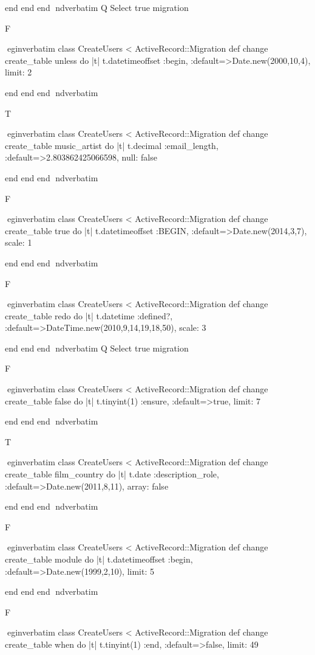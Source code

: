     end 
  end 
end
nd{verbatim}
Q
 Select true migration

F

egin{verbatim}
 class CreateUsers < ActiveRecord::Migration 
  def change 
    create_table unless do |t| 
      t.datetimeoffset :begin, :default=>Date.new(2000,10,4), limit: 2
    
    end 
  end 
end
nd{verbatim}

T

egin{verbatim}
 class CreateUsers < ActiveRecord::Migration 
  def change 
    create_table music_artist do |t| 
      t.decimal :email_length, :default=>2.803862425066598, null: false
    
    end 
  end 
end
nd{verbatim}

F

egin{verbatim}
 class CreateUsers < ActiveRecord::Migration 
  def change 
    create_table true do |t| 
      t.datetimeoffset :BEGIN, :default=>Date.new(2014,3,7), scale: 1
    
    end 
  end 
end
nd{verbatim}

F

egin{verbatim}
 class CreateUsers < ActiveRecord::Migration 
  def change 
    create_table redo do |t| 
      t.datetime :defined?, :default=>DateTime.new(2010,9,14,19,18,50), scale: 3
    
    end 
  end 
end
nd{verbatim}
Q
 Select true migration

F

egin{verbatim}
 class CreateUsers < ActiveRecord::Migration 
  def change 
    create_table false do |t| 
      t.tinyint(1) :ensure, :default=>true, limit: 7
    
    end 
  end 
end
nd{verbatim}

T

egin{verbatim}
 class CreateUsers < ActiveRecord::Migration 
  def change 
    create_table film_country do |t| 
      t.date :description_role, :default=>Date.new(2011,8,11), array: false
    
    end 
  end 
end
nd{verbatim}

F

egin{verbatim}
 class CreateUsers < ActiveRecord::Migration 
  def change 
    create_table module do |t| 
      t.datetimeoffset :begin, :default=>Date.new(1999,2,10), limit: 5
    
    end 
  end 
end
nd{verbatim}

F

egin{verbatim}
 class CreateUsers < ActiveRecord::Migration 
  def change 
    create_table when do |t| 
      t.tinyint(1) :end, :default=>false, limit: 49
    
